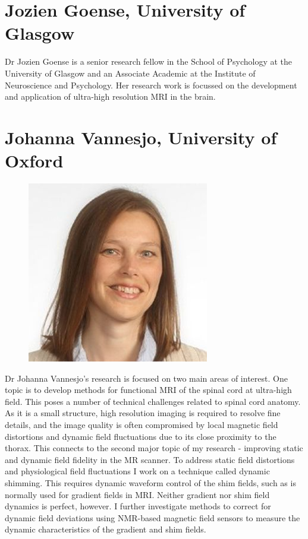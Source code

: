 \documentclass[a5paper,10pt,twoside,onecolumn,openany,helvetica,showtrims]{memoir}
\newlength{\SpeakerSize}
\begin{document}
\section*{Jozien Goense, University of Glasgow}

Dr Jozien Goense is a senior research fellow in the School of Psychology at the University of Glasgow and an Associate Academic at the Institute of Neuroscience and Psychology. Her research work is focussed on the development and application of ultra-high resolution MRI in the brain.
\clearpage
\section*{Johanna Vannesjo, University of Oxford}
\begin{figure}
\includegraphics[width=\SpeakerSize]{SpeakerPics/image11}	
\end{figure}
 Dr Johanna Vannesjo's research is focused on two main areas of interest. One topic is to develop methods for functional MRI of the spinal cord at ultra-high field. This poses a number of technical challenges related to spinal cord anatomy. As it is a small structure, high resolution imaging is required to resolve fine details, and the image quality is often compromised by local magnetic field distortions and dynamic field fluctuations due to its close proximity to the thorax. This connects to the second major topic of my research - improving static and dynamic field fidelity in the MR scanner. To address static field distortions and physiological field fluctuations I work on a technique called dynamic shimming. This requires dynamic waveform control of the shim fields, such as is normally used for gradient fields in MRI. Neither gradient nor shim field dynamics is perfect, however. I further investigate methods to correct for dynamic field deviations using NMR-based magnetic field sensors to measure the dynamic characteristics of the gradient and shim fields.
\end{document}
